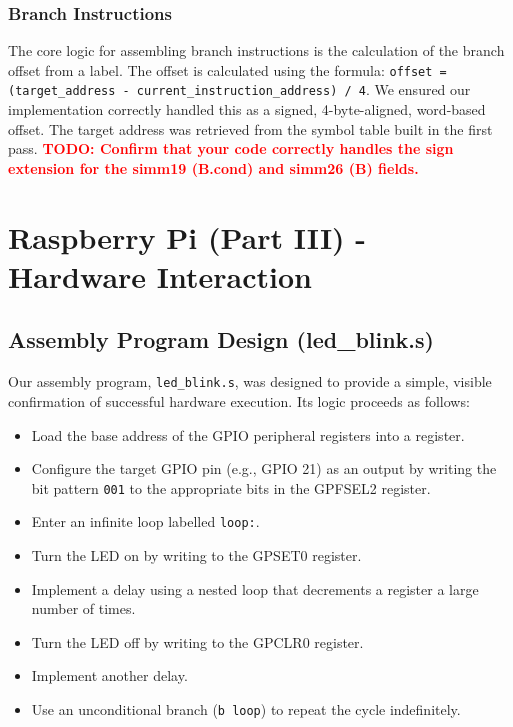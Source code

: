 \documentclass[11pt]{article}
\newcommand{\todo}[1]{\textcolor{red}{\textbf{TODO: #1}}}
\begin{document}
\subsubsection{Branch Instructions}
The core logic for assembling branch instructions is the calculation of the branch offset from a label. The offset is calculated using the formula: \texttt{offset = (target\_address - current\_instruction\_address) / 4}. We ensured our implementation correctly handled this as a signed, 4-byte-aligned, word-based offset. The target address was retrieved from the symbol table built in the first pass. 
\todo{Confirm that your code correctly handles the sign extension for the simm19 (B.cond) and simm26 (B) fields.}


\section{Raspberry Pi (Part III) - Hardware Interaction}

\subsection{Assembly Program Design (led\_blink.s)}
Our assembly program, \texttt{led\_blink.s}, was designed to provide a simple, visible confirmation of successful hardware execution. Its logic proceeds as follows:
\begin{itemize}
    \item Load the base address of the GPIO peripheral registers into a register.
    \item Configure the target GPIO pin (e.g., GPIO 21) as an output by writing the bit pattern \texttt{001} to the appropriate bits in the GPFSEL2 register.
    \item Enter an infinite loop labelled \texttt{loop:}.
    \item Turn the LED on by writing to the GPSET0 register.
    \item Implement a delay using a nested loop that decrements a register a large number of times.
    \item Turn the LED off by writing to the GPCLR0 register.
    \item Implement another delay.
    \item Use an unconditional branch (\texttt{b loop}) to repeat the cycle indefinitely.
\end{itemize}
\end{document}
